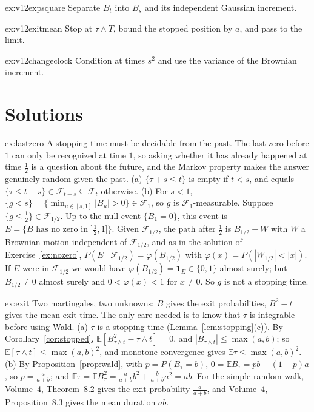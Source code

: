 \begin{hint}{ex:v12expsquare}
Separate $B_t$ into $B_s$ and its independent Gaussian increment.
\end{hint}

\begin{hint}{ex:v12exitmean}
Stop at $\tau\wedge T$, bound the stopped position by $a$, and pass to the limit.
\end{hint}

\begin{hint}{ex:v12changeclock}
Condition at times $s^2$ and use the variance of the Brownian increment.
\end{hint}

\section{Solutions}

\begin{solution}{ex:lastzero}
\idea A stopping time must be decidable from the past. The last zero before $1$ can only be recognized at time $1$, so asking whether it has already happened at time $\frac12$ is a question about the future,
and the Markov property makes the answer genuinely random given the past.
\writeup (a) $\{\tau+s\le t\}$ is empty if $t<s$, and equals $\{\tau\le t-s\}\in\mathcal F_{t-s}\subseteq\mathcal F_t$ otherwise.
(b) For $s<1$, $\{g<s\}=\{\min_{u\in[s,1]}|B_u|>0\}\in\mathcal F_1$, so $g$ is $\mathcal F_1$-measurable. Suppose $\{g\le\frac12\}\in\mathcal F_{1/2}$. Up to the null event $\{B_1=0\}$, this event is
$E=\{B\text{ has no zero in }]\frac12,1]\}$. Given $\mathcal F_{1/2}$, the path after $\frac12$ is $B_{1/2}+W$ with $W$ a Brownian motion independent of $\mathcal F_{1/2}$, and as in the solution of Exercise~\ref{ex:nozero},
$P(E\mid\mathcal F_{1/2})=\varphi(B_{1/2})$ with $\varphi(x)=P(|W_{1/2}|<|x|)$. If $E$ were in $\mathcal F_{1/2}$ we would have $\varphi(B_{1/2})=\mathbf 1_E\in\{0,1\}$ almost surely; but $B_{1/2}\ne0$ almost surely and
$0<\varphi(x)<1$ for $x\ne0$. So $g$ is not a stopping time.
\end{solution}

\begin{solution}{ex:exit}
\idea Two martingales, two unknowns: $B$ gives the exit probabilities, $B^2-t$ gives the mean exit time. The only care needed is to know that $\tau$ is integrable before using Wald.
\writeup (a) $\tau$ is a stopping time (Lemma~\ref{lem:stopping}(c)). By Corollary~\ref{cor:stopped}, $\mathbb E[B^2_{\tau\wedge t}-\tau\wedge t]=0$, and $|B_{\tau\wedge t}|\le\max(a,b)$; so
$\mathbb E[\tau\wedge t]\le\max(a,b)^2$, and monotone convergence gives $\mathbb E\tau\le\max(a,b)^2$. (b) By Proposition~\ref{prop:wald}, with $p=P(B_\tau=b)$, $0=\mathbb EB_\tau=pb-(1-p)a$, so $p=\frac a{a+b}$; and
$\mathbb E\tau=\mathbb EB_\tau^2=\frac a{a+b}b^2+\frac b{a+b}a^2=ab$. For the simple random walk, Volume~4, Theorem~8.2 gives the exit probability $\frac a{a+b}$, and Volume~4, Proposition~8.3 gives the mean duration $ab$.
\end{solution}

